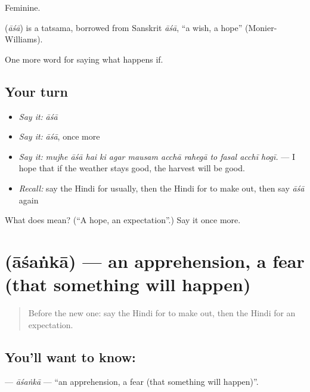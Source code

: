 Feminine.

\begin{cousinweb}
\textbf{} (\emph{āśā}) is a tatsama, borrowed from Sanskrit \emph{āśā}, \textquotedblleft{}a wish, a hope\textquotedblright{} (Monier-Williams).
\end{cousinweb}

\begin{grammarlens}[title={What you've built}]
One more word for saying what happens if.
\end{grammarlens}

\subsection*{Your turn}
\begin{itemize}
\raggedright
  \item \emph{Say it:} \emph{āśā}
  \item \emph{Say it:} \emph{āśā}, once more
  \item \emph{Say it:} \emph{mujhe āśā hai ki agar mausam acchā rahegā to fasal acchī hogī.} — I hope that if the weather stays good, the harvest will be good.
  \item \emph{Recall:} say the Hindi for usually, then the Hindi for to make out, then say \emph{āśā} again
\end{itemize}

\begin{tcolorbox}[breakable,colback=teal!4,colframe=teal!35!black,title={Before you move on}]
What does  mean? (\textquotedblleft{}A hope, an expectation\textquotedblright{}.) Say it once more.
\end{tcolorbox}
\section[\texorpdfstring{\hi{आशंका} (āśaṅkā)}{आशंका (āśaṅkā)}]{ (āśaṅkā) — an apprehension, a fear (that something will happen)}

\label{lesson:HI-C375-asanka}



\begin{quote}
Before the new one: say the Hindi for to make out, then the Hindi for an expectation.
\end{quote}

\subsection*{You'll want to know: }
\textbf{} — \emph{āśaṅkā} — \textquotedblleft{}an apprehension, a fear (that something will happen)\textquotedblright{}.

